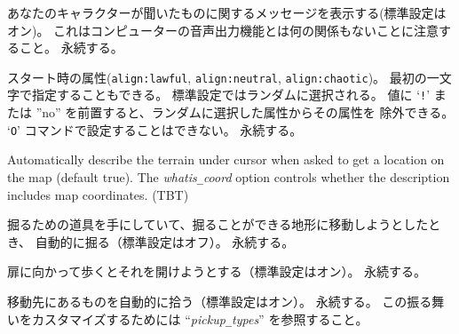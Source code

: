 \blist{}
\item[\ib{acoustics}]
あなたのキャラクターが聞いたものに関するメッセージを表示する(標準設定はオン)。
これはコンピューターの音声出力機能とは何の関係もないことに注意すること。
永続する。
\item[\ib{align}]
スタート時の属性({\tt align:lawful}, {\tt align:neutral},
{\tt align:chaotic})。
最初の一文字で指定することもできる。
標準設定ではランダムに選択される。
値に `{\tt !}' または ''no'' を前置すると、ランダムに選択した属性からその属性を
除外できる。
`{\tt O}' コマンドで設定することはできない。
永続する。
\item[\ib{autodescribe}]
Automatically describe the terrain under cursor when asked to get a location
on the map (default true).
The {\it whatis\verb+_+coord\/}
option controls whether the description includes map coordinates.
(TBT)
\item[\ib{autodig}]
掘るための道具を手にしていて、掘ることができる地形に移動しようとしたとき、
自動的に掘る（標準設定はオフ）。
永続する。
\item[\ib{autoopen}]
扉に向かって歩くとそれを開けようとする（標準設定はオン）。
永続する。
\item[\ib{autopickup}]
移動先にあるものを自動的に拾う（標準設定はオン）。
永続する。
この振る舞いをカスタマイズするためには
``{\it pickup\verb+_+types\/}'' を参照すること。
\item[\ib{autoquiver}]

